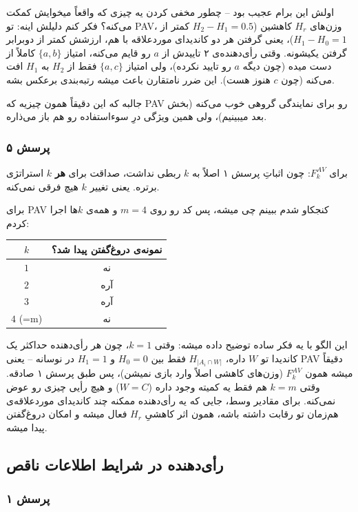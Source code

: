 \documentclass[12pt, a4paper]{article}
\begin{document}
اولش این برام عجیب بود -- چطور مخفی کردن یه چیزی که واقعاً میخوایش کمکت می‌کنه؟ فکر کنم دلیلش اینه: تو PAV، وزن‌های $H_r$ کاهشین ($H_2-H_1=0.5$ کمتر از $H_1-H_0=1$)، یعنی گرفتن هر دو کاندیدای موردعلاقه با هم، ارزشش کمتر از دوبرابر گرفتن یکیشونه. وقتی رأی‌دهنده‌ی ۲ تاییدش از $a$ رو قایم می‌کنه، امتیاز $\{a,b\}$ کاملاً از دست میده (چون دیگه $a$ رو تایید نکرده)، ولی امتیاز $\{a,c\}$ فقط از $H_2$ به $H_1$ افت می‌کنه (چون $c$ هنوز هست). این ضرر نامتقارن باعث میشه رتبه‌بندی برعکس بشه.

جالبه که این دقیقاً همون چیزیه که PAV رو برای نمایندگی گروهی خوب می‌کنه (بخش بعد میبینیم)، ولی همین ویژگی درِ سوءاستفاده رو هم باز می‌ذاره.

\subsubsection*{پرسش ۵}

برای $F_k^{AV}$: چون اثباتِ پرسش ۱ اصلاً به $k$ ربطی نداشت، صداقت برای \textbf{هر} $k$ استراتژی برتره. یعنی تغییر $k$ هیچ فرقی نمی‌کنه.

برای PAV کنجکاو شدم ببینم چی میشه، پس کد رو روی $m=4$ و همه‌ی $k$ها اجرا کردم:

\begin{center}
\begin{tabular}{c|c}
$k$ & نمونه‌ی دروغ‌گفتن پیدا شد؟ \\
\hline
$1$ & نه \\
$2$ & آره \\
$3$ & آره \\
$4$ (=m) & نه
\end{tabular}
\end{center}

این الگو با یه فکر ساده توضیح داده میشه: وقتی $k=1$، چون هر رأی‌دهنده حداکثر یک کاندیدا تو $W$ داره، $H_{|A_i\cap W|}$ فقط بین $H_0=0$ و $H_1=1$ در نوسانه -- یعنی PAV دقیقاً میشه همون $F_k^{AV}$ (وزن‌های کاهشی اصلاً وارد بازی نمیشن)، پس طبق پرسش ۱ صادقه. وقتی $k=m$ هم فقط یه کمیته وجود داره ($W=C$) و هیچ رأیی چیزی رو عوض نمی‌کنه. برای مقادیر وسط، جایی که یه رأی‌دهنده ممکنه چند کاندیدای موردعلاقه‌ی هم‌زمان تو رقابت داشته باشه، همون اثر کاهشیِ $H_r$ فعال میشه و امکان دروغ‌گفتن پیدا میشه.

\subsection{رأی‌دهنده در شرایط اطلاعات ناقص}

\subsubsection*{پرسش ۱}
\end{document}
